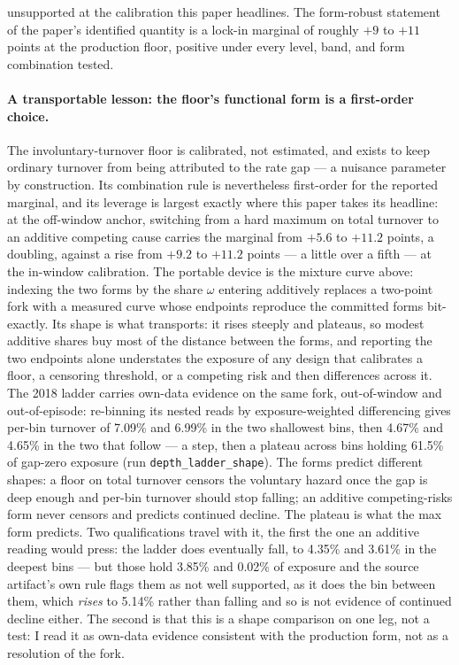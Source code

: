 \documentclass[12pt]{article}
\begin{document}
unsupported at the calibration this paper headlines. The form-robust statement of the paper's identified quantity is a lock-in marginal of roughly $+9$ to $+11$ points at the production floor, positive under every level, band, and form combination tested.

\paragraph{A transportable lesson: the floor's functional form is a first-order choice.} The involuntary-turnover floor is calibrated, not estimated, and exists to keep ordinary turnover from being attributed to the rate gap --- a nuisance parameter by construction. Its combination rule is nevertheless first-order for the reported marginal, and its leverage is largest exactly where this paper takes its headline: at the off-window anchor, switching from a hard maximum on total turnover to an additive competing cause carries the marginal from $+5.6$ to $+11.2$ points, a doubling, against a rise from $+9.2$ to $+11.2$ points --- a little over a fifth --- at the in-window calibration. The portable device is the mixture curve above: indexing the two forms by the share $\omega$ entering additively replaces a two-point fork with a measured curve whose endpoints reproduce the committed forms bit-exactly. Its shape is what transports: it rises steeply and plateaus, so modest additive shares buy most of the distance between the forms, and reporting the two endpoints alone understates the exposure of any design that calibrates a floor, a censoring threshold, or a competing risk and then differences across it. The 2018 ladder carries own-data evidence on the same fork, out-of-window and out-of-episode: re-binning its nested reads by exposure-weighted differencing gives per-bin turnover of 7.09\% and 6.99\% in the two shallowest bins, then 4.67\% and 4.65\% in the two that follow --- a step, then a plateau across bins holding 61.5\% of gap-zero exposure (run \texttt{depth\_ladder\_shape}). The forms predict different shapes: a floor on total turnover censors the voluntary hazard once the gap is deep enough and per-bin turnover should stop falling; an additive competing-risks form never censors and predicts continued decline. The plateau is what the max form predicts. Two qualifications travel with it, the first the one an additive reading would press: the ladder does eventually fall, to 4.35\% and 3.61\% in the deepest bins --- but those hold 3.85\% and 0.02\% of exposure and the source artifact's own rule flags them as not well supported, as it does the bin between them, which \emph{rises} to 5.14\% rather than falling and so is not evidence of continued decline either. The second is that this is a shape comparison on one leg, not a test: I read it as own-data evidence consistent with the production form, not as a resolution of the fork.
\end{document}
